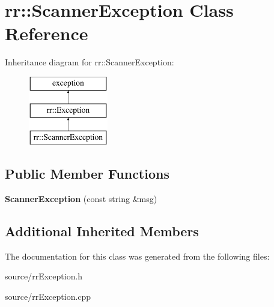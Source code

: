 \hypertarget{classrr_1_1_scanner_exception}{\section{rr\-:\-:Scanner\-Exception Class Reference}
\label{classrr_1_1_scanner_exception}
}
Inheritance diagram for rr\-:\-:Scanner\-Exception\-:\begin{figure}[H]
\begin{center}
\leavevmode
\includegraphics[height=3.000000cm]{classrr_1_1_scanner_exception}
\end{center}
\end{figure}
\subsection*{Public Member Functions}
\begin{DoxyCompactItemize}
\item 
\hypertarget{classrr_1_1_scanner_exception_a373fc1c139e632ab8c1d9c06ff81195f}{{\bfseries Scanner\-Exception} (const string \&msg)}\label{classrr_1_1_scanner_exception_a373fc1c139e632ab8c1d9c06ff81195f}

\end{DoxyCompactItemize}
\subsection*{Additional Inherited Members}


The documentation for this class was generated from the following files\-:\begin{DoxyCompactItemize}
\item 
source/rr\-Exception.\-h\item 
source/rr\-Exception.\-cpp\end{DoxyCompactItemize}
